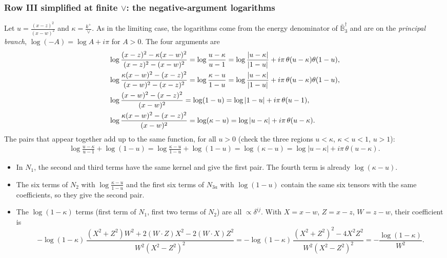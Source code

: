 \documentclass[9pt]{article}
\numberwithin{equation}{section}
\begin{document}
\subsubsection*{{\color{red}Row III simplified at finite $\vee$: the negative-argument logarithms}}
{\color{red}Let $u=\frac{(x-z)^{2}}{(x-w)^{2}}$ and $\kappa=\frac{k^{+}}{\vee}$. As in the limiting case, the logarithms come from the energy denominator of $\bar{\mathbb B}_{3}^{\dagger}$ and are on the \emph{principal branch}, $\log(-A)=\log A+i\pi$ for $A>0$. The four arguments are
\begin{align}
&\log\frac{(x-z)^{2}-\kappa(x-w)^{2}}{(x-z)^{2}-(x-w)^{2}}=\log\frac{u-\kappa}{u-1}=\log\frac{|u-\kappa|}{|1-u|}+i\pi\,\theta(u-\kappa)\theta(1-u),\notag\\
&\log\frac{\kappa(x-w)^{2}-(x-z)^{2}}{(x-w)^{2}-(x-z)^{2}}=\log\frac{\kappa-u}{1-u}=\log\frac{|u-\kappa|}{|1-u|}+i\pi\,\theta(u-\kappa)\theta(1-u),\notag\\
&\log\frac{(x-w)^{2}-(x-z)^{2}}{(x-w)^{2}}=\log(1-u)=\log|1-u|+i\pi\,\theta(u-1),\notag\\
&\log\frac{\kappa(x-w)^{2}-(x-z)^{2}}{(x-w)^{2}}=\log(\kappa-u)=\log|u-\kappa|+i\pi\,\theta(u-\kappa).
\end{align}
The pairs that appear together add up to the same function, for all $u>0$ (check the three regions $u<\kappa$, $\kappa<u<1$, $u>1$):
\begin{align}
\log\frac{u-\kappa}{u-1}+\log(1-u)=\log\frac{\kappa-u}{1-u}+\log(1-u)=\log(\kappa-u)=\log|u-\kappa|+i\pi\,\theta(u-\kappa).
\end{align}
\begin{itemize}
\item In $N_{1}$, the second and third terms have the same kernel and give the first pair. The fourth term is already $\log(\kappa-u)$.
\item The six terms of $N_{2}$ with $\log\frac{\kappa-u}{1-u}$ and the first six terms of $N_{3a}$ with $\log(1-u)$ contain the same six tensors with the same coefficients, so they give the second pair.
\item The $\log(1-\kappa)$ terms (first term of $N_{1}$, first two terms of $N_{2}$) are all $\propto\delta^{ij}$. With $X=x-w$, $Z=x-z$, $W=z-w$, their coefficient is
\begin{equation*}
-\log(1-\kappa)\,\frac{(X^{2}+Z^{2})W^{2}+2(W\cdot Z)X^{2}-2(W\cdot X)Z^{2}}{W^{2}(X^{2}-Z^{2})^{2}}=-\log(1-\kappa)\,\frac{(X^{2}+Z^{2})^{2}-4X^{2}Z^{2}}{W^{2}(X^{2}-Z^{2})^{2}}=-\frac{\log(1-\kappa)}{W^{2}}.
\end{equation*}

\end{itemize}}
\end{document}
